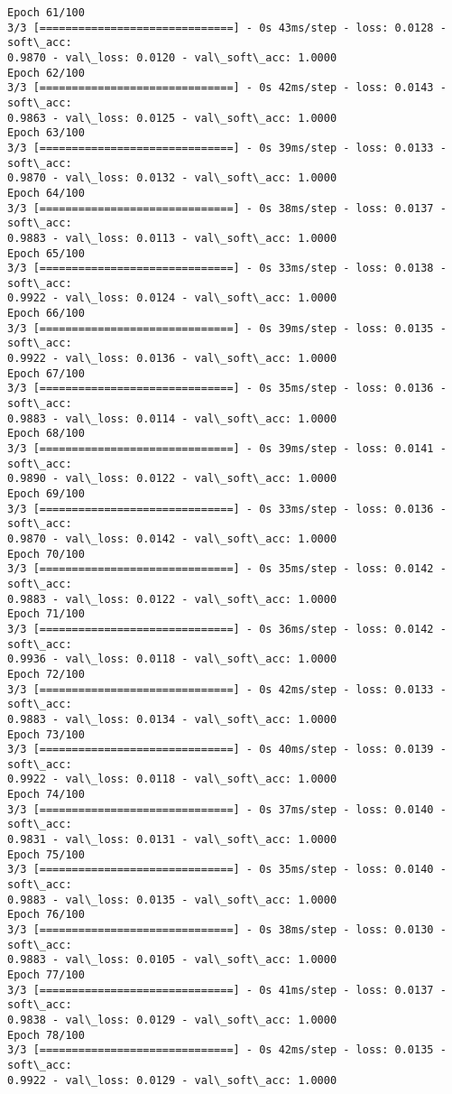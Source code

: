 \documentclass[11pt]{article}
\begin{document}
\begin{Verbatim}[commandchars=\\\{\}]
Epoch 61/100
3/3 [==============================] - 0s 43ms/step - loss: 0.0128 - soft\_acc:
0.9870 - val\_loss: 0.0120 - val\_soft\_acc: 1.0000
Epoch 62/100
3/3 [==============================] - 0s 42ms/step - loss: 0.0143 - soft\_acc:
0.9863 - val\_loss: 0.0125 - val\_soft\_acc: 1.0000
Epoch 63/100
3/3 [==============================] - 0s 39ms/step - loss: 0.0133 - soft\_acc:
0.9870 - val\_loss: 0.0132 - val\_soft\_acc: 1.0000
Epoch 64/100
3/3 [==============================] - 0s 38ms/step - loss: 0.0137 - soft\_acc:
0.9883 - val\_loss: 0.0113 - val\_soft\_acc: 1.0000
Epoch 65/100
3/3 [==============================] - 0s 33ms/step - loss: 0.0138 - soft\_acc:
0.9922 - val\_loss: 0.0124 - val\_soft\_acc: 1.0000
Epoch 66/100
3/3 [==============================] - 0s 39ms/step - loss: 0.0135 - soft\_acc:
0.9922 - val\_loss: 0.0136 - val\_soft\_acc: 1.0000
Epoch 67/100
3/3 [==============================] - 0s 35ms/step - loss: 0.0136 - soft\_acc:
0.9883 - val\_loss: 0.0114 - val\_soft\_acc: 1.0000
Epoch 68/100
3/3 [==============================] - 0s 39ms/step - loss: 0.0141 - soft\_acc:
0.9890 - val\_loss: 0.0122 - val\_soft\_acc: 1.0000
Epoch 69/100
3/3 [==============================] - 0s 33ms/step - loss: 0.0136 - soft\_acc:
0.9870 - val\_loss: 0.0142 - val\_soft\_acc: 1.0000
Epoch 70/100
3/3 [==============================] - 0s 35ms/step - loss: 0.0142 - soft\_acc:
0.9883 - val\_loss: 0.0122 - val\_soft\_acc: 1.0000
Epoch 71/100
3/3 [==============================] - 0s 36ms/step - loss: 0.0142 - soft\_acc:
0.9936 - val\_loss: 0.0118 - val\_soft\_acc: 1.0000
Epoch 72/100
3/3 [==============================] - 0s 42ms/step - loss: 0.0133 - soft\_acc:
0.9883 - val\_loss: 0.0134 - val\_soft\_acc: 1.0000
Epoch 73/100
3/3 [==============================] - 0s 40ms/step - loss: 0.0139 - soft\_acc:
0.9922 - val\_loss: 0.0118 - val\_soft\_acc: 1.0000
Epoch 74/100
3/3 [==============================] - 0s 37ms/step - loss: 0.0140 - soft\_acc:
0.9831 - val\_loss: 0.0131 - val\_soft\_acc: 1.0000
Epoch 75/100
3/3 [==============================] - 0s 35ms/step - loss: 0.0140 - soft\_acc:
0.9883 - val\_loss: 0.0135 - val\_soft\_acc: 1.0000
Epoch 76/100
3/3 [==============================] - 0s 38ms/step - loss: 0.0130 - soft\_acc:
0.9883 - val\_loss: 0.0105 - val\_soft\_acc: 1.0000
Epoch 77/100
3/3 [==============================] - 0s 41ms/step - loss: 0.0137 - soft\_acc:
0.9838 - val\_loss: 0.0129 - val\_soft\_acc: 1.0000
Epoch 78/100
3/3 [==============================] - 0s 42ms/step - loss: 0.0135 - soft\_acc:
0.9922 - val\_loss: 0.0129 - val\_soft\_acc: 1.0000

\end{Verbatim}
\end{document}
